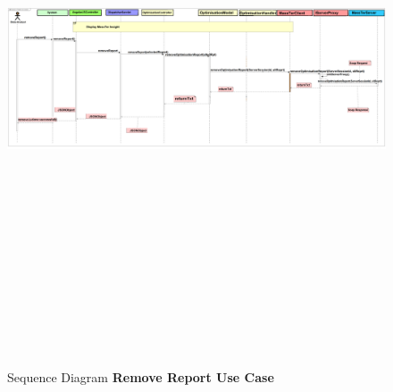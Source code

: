    \begin{figure}[h]
   	\centering
   	\includegraphics[width=17.5cm,height=17cm]{SequenceDiagramRemoveReport.png}
   	\caption{Sequence Diagram \textbf{Remove Report Use Case}}
   \end{figure}
	
	\pagebreak
	\clearpage
	\newpage
	

